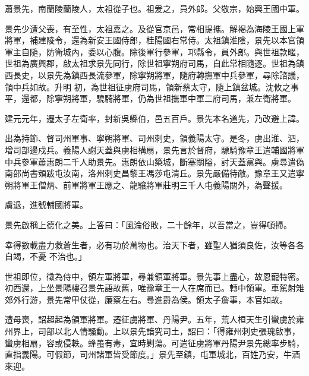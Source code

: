 
\begin{pinyinscope}

 蕭景先，南蘭陵蘭陵人，太祖從子也。祖爰之，員外郎。父敬宗，始興王國中軍。



 景先少遭父喪，有至性，太祖嘉之。及從官京邑，常相提攜。解褐為海陵王國上軍將軍，補建陵令，還為新安王國侍郎，桂陽國右常侍。太祖鎮淮陰，景先以本官領軍主自隨，防衛城內，委以心腹。除後軍行參軍，邛縣令，員外郎。與世祖款暱，世祖為廣興郡，啟太祖求景先同行，除世祖寧朔府司馬，自此常相隨逐。世祖為鎮西長史，以景先為鎮西長流參軍，除寧朔將軍，隨府轉撫軍中兵參軍，尋除諮議，領中兵如故。升明
 初，為世祖征虜府司馬，領新蔡太守，隨上鎮盆城。沈攸之事平，還都，除寧朔將軍，驍騎將軍，仍為世祖撫軍中軍二府司馬，兼左衛將軍。



 建元元年，遷太子左衛率，封新吳縣伯，邑五百戶。景先本名道先，乃改避上諱。



 出為持節、督司州軍事、寧朔將軍、司州刺史，領義陽太守。是冬，虜出淮、泗，增司部邊戍兵。義陽人謝天蓋與虜相構扇，景先言於督府，驃騎豫章王遣輔國將軍中兵參軍蕭惠朗二千人助景先。惠朗依山築城，斷塞關隘，討天蓋黨與。虜尋遣偽南部尚書頞跋屯汝南，洛州刺史昌黎王馮莎屯清丘。景先嚴備待敵。豫章王又遣寧朔將軍王僧炳、前軍將軍王應之、龍驤將軍莊明三千人屯義陽關外，為聲援。



 虜退，進號輔國將軍。



 景先啟稱上德化之美。上答曰：「風淪俗敗，二十餘年，以吾當之，豈得頓掃。



 幸得數載盡力救蒼生者，必有功於萬物也。治天下者，雖聖人猶須良佐，汝等各各自竭，不憂
 不治也。」



 世祖即位，徵為侍中，領左軍將軍，尋兼領軍將軍。景先事上盡心，故恩寵特密。初西還，上坐景陽樓召景先語故舊，唯豫章王一人在席而已。轉中領軍。車駕射雉郊外行游，景先常甲仗從，廉察左右。尋進爵為侯。領太子詹事，本官如故。



 遭母喪，詔超起為領軍將軍。遷征虜將軍、丹陽尹。五年，荒人桓天生引蠻虜於雍州界上，司部以北人情騷動。上以景先諳究司土，詔曰：「得雍州刺史張瑰啟事，蠻虜相扇，容或侵軼。蜂蠆有毒，宜時剿蕩。可遣征虜將軍丹陽尹景先總率步騎，直指義陽。可假節，司州諸軍皆受節度。」景先至鎮，屯軍城北，百姓乃安，牛酒來迎。




\end{pinyinscope}
